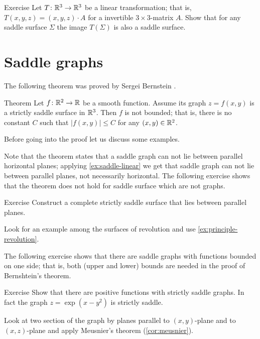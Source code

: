 \begin{thm}{Exercise}\label{ex:saddle-linear}
Let $T\colon\mathbb{R}^3\to\mathbb{R}^3$ be a linear transformation; that is, $T(x,y,z)=(x,y,z)\cdot A$ for a invertible $3{\times}3$-matrix $A$. 
Show that for any saddle surface $\Sigma$ the image $T(\Sigma)$ is also a saddle surface.
\end{thm}

\section*{Saddle graphs}

The following theorem was proved by Sergei Bernstein \cite{bernstein}.

\begin{thm}{Theorem}\label{thm:bernshtein}
Let $f\colon\mathbb{R}^2\to\mathbb{R}$ be a smooth function.
Assume its graph $z=f(x,y)$ is a strictly saddle surface in $\mathbb{R}^3$.
Then $f$ is not bounded;
that is, there is no constant $C$ such that 
$|f(x,y)|\le C$ for any $(x,y)\in\mathbb{R}^2$.
\end{thm}

Before going into the proof let us discuss some examples.

Note that the theorem states that a saddle graph can not lie between parallel horizontal planes;
applying \ref{ex:saddle-linear} we get that saddle graph can not lie between parallel planes,
not necessarily horizontal.
The following exercise shows that the theorem does not hold for saddle surface which are not graphs.


\begin{thm}{Exercise}\label{ex:between-parallels}
Construct a complete strictly saddle surface that lies between parallel planes.
\end{thm}

 Look for an example among the surfaces of revolution and use \ref{ex:principle-revolution}.


The following exercise shows that there are saddle graphs with functions bounded on one side; that is, both (upper and lower) bounds are needed in the proof of Bernshtein's theorem.

\begin{thm}{Exercise}\label{ex:one-side-bernshtein}
Show that there are positive functions with strictly saddle graphs.
In fact the graph
$z=\exp(x-y^2)$
is strictly saddle.
\end{thm}

 Look at two section of the graph by planes parallel to $(x,y)$-plane and to $(x,z)$-plane and apply Meusnier's theorem (\ref{cor:meusnier}).

